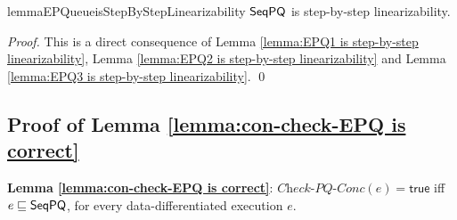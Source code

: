 
\begin{restatable}{lemma}{EPQueueisStepByStepLinearizability}
\label{lemma:EPQ is step-by-step linearizability}
$\mathsf{SeqPQ}$ is step-by-step linearizability.
\end{restatable}

\begin {proof}
This is a direct consequence of Lemma \ref{lemma:EPQ1 is step-by-step linearizability}, Lemma \ref{lemma:EPQ2 is step-by-step linearizability} and Lemma \ref{lemma:EPQ3 is step-by-step linearizability}. \qed
\end {proof}



\subsection{Proof of Lemma \ref{lemma:con-check-EPQ is correct}}
\label{sec:appendix subsection proof of lemma con-check-EPQ is correct}



{\noindent \bf Lemma \ref{lemma:con-check-EPQ is correct}}: $\textit{Check-PQ-Conc}(e)=\mathsf{true}$ iff $e \sqsubseteq \mathsf{SeqPQ}$, for every data-differentiated execution $e$.

